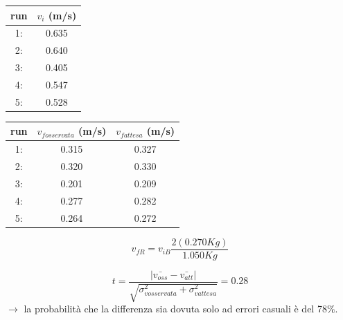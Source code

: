 \documentclass[a4paper]{article}
\theoremstyle{definition}
\begin{document}
\begin{minipage}[c]{0.5\textwidth}
	\captionsetup{labelformat=empty}
	\centering
	\begin{tabular}{||cc||}
		\hline
		\hline
		run &  \(v_{i}\) (m/s)\\
		\hline
		1: &0.635  \\ 
		2: &0.640 \\
		3: &0.405 \\
		4: &0.547\\
		5: &0.528 \\
		\hline
		\hline
	\end{tabular}
	
\end{minipage}
\begin{minipage}[c]{0.5\textwidth}
	\captionsetup{labelformat=empty}
	\centering
	\begin{tabular}{||ccc||}
		\hline
		\hline
		run &  \(v_{fosservata}\) (m/s) & \(v_{fattesa}\) (m/s)\\
		\hline
		1: &0.315  & 0.327\\
		2: &0.320 &0.330\\
		3: &0.201&0.209\\
		4: &0.277 &0.282\\
		5: & 0.264&0.272\\
		\hline
		\hline
	\end{tabular}
\end{minipage}

\[v_{f R} = v_{i B} \frac{2 (0.270 Kg)}{1.050 Kg}\]

\[t = \frac{ \left |\bar{v_{oss}}  - \bar{v_{att}} \right |}{\sqrt{\sigma_{vosservata}^{2}+ \sigma_{vattesa}^{2}}} = 0.28 \]
\noindent \(\rightarrow\) la probabilità che la differenza sia dovuta solo ad errori casuali è del 78\(\%\).\\\\\\\\\\\\\\\\\\\\\\\\
\end{document}
